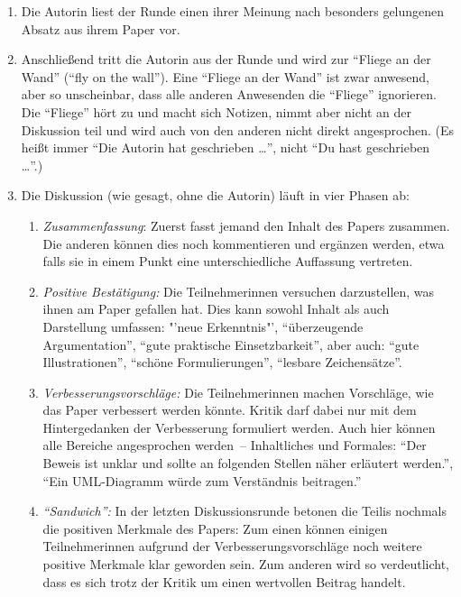 \begin{enumerate}
\item Die Autorin liest der Runde einen ihrer Meinung nach besonders
gelungenen Absatz aus ihrem Paper vor.

\item Anschließend tritt die Autorin aus der Runde und wird zur "`Fliege an
der Wand"' ("`fly on the wall"'). Eine "`Fliege an der Wand"' ist zwar
anwesend, aber so unscheinbar, dass alle anderen Anwesenden
die "`Fliege"' ignorieren. Die "`Fliege"' hört zu und macht sich Notizen, nimmt aber
nicht an der Diskussion teil und wird auch von den anderen nicht direkt
angesprochen. (Es heißt immer "`Die Autorin hat geschrieben \ldots"', nicht "`Du
hast geschrieben \ldots"'.)

\item Die Diskussion (wie gesagt, ohne die Autorin) läuft in vier Phasen ab:

\begin{enumerate}
\item \emph{Zusammenfassung}: Zuerst fasst jemand den Inhalt des Papers zusammen.
Die anderen können dies noch kommentieren und ergänzen werden, etwa falls
sie in einem Punkt eine unterschiedliche Auffassung vertreten.

\item \emph{Positive Bestätigung:} Die Teilnehmerinnen versuchen
darzustellen, was ihnen am Paper gefallen hat. Dies kann sowohl Inhalt
als auch Darstellung umfassen: "'neue Erkenntnis"', "`überzeugende
Argumentation"', "`gute praktische Einsetzbarkeit"', aber auch: "`gute
Illustrationen"', "`schöne Formulierungen"', "`lesbare Zeichensätze"'.

\item \emph{Verbesserungsvorschläge:} Die Teilnehmerinnen machen
Vorschläge, wie das Paper verbessert werden könnte. Kritik darf
dabei nur mit dem Hintergedanken der Verbesserung formuliert werden.
Auch hier können alle Bereiche angesprochen werden~-- Inhaltliches und
Formales: "`Der Beweis ist unklar und sollte an folgenden Stellen
näher erläutert werden."', "`Ein UML-Diagramm würde zum Verständnis
beitragen."'

\item \emph{"`Sandwich"':} In der letzten Diskussionsrunde betonen die Teilis nochmals die
positiven Merkmale des Papers: Zum einen können einigen
Teilnehmerinnen aufgrund der Verbesserungsvorschläge noch weitere positive
Merkmale klar geworden sein. Zum anderen wird so verdeutlicht, dass es
sich trotz der Kritik um einen wertvollen Beitrag handelt.
\end{enumerate}


\end{enumerate}
